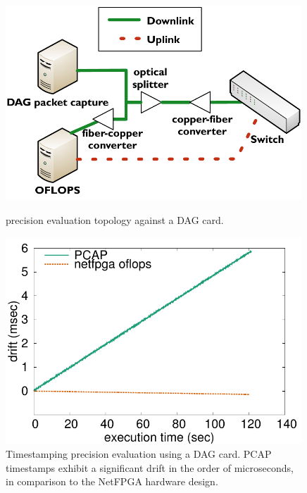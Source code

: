 \begin{figure}
\centering
  \begin{minipage}[b]{0.45\textwidth}
\centering
 \includegraphics[width=0.99\textwidth]{Chapter1/Chapter1Figs/accuracy-topology} 
 \caption{\oflops precision evaluation topology against a DAG card.} 
 \label{fig:timestamping_topology}
\end{minipage}
\hspace{0.5cm}
  \begin{minipage}[b]{0.45\textwidth}
\centering
 \includegraphics[width=0.99\textwidth]{Chapter1/Chapter1Figs/timer-precision} 
 \caption[Precision evaluation of PCAP and NetFPGA timestamps]{Timestamping
 precision evaluation using a DAG card. PCAP timestamps exhibit a significant
 drift in the order of microseconds, in comparison to the NetFPGA hardware
 design.}
\label{fig:timestamping}
\end{minipage}
\end{figure}

